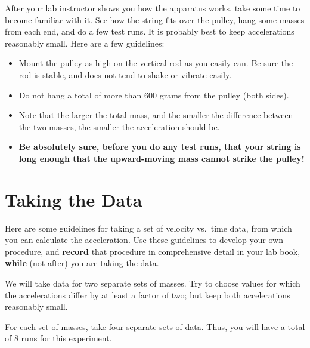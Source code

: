 
After your lab instructor shows you how the apparatus works, take some
time to become familiar with it.  See how the string fits over the
pulley, hang some masses from each end, and do a few test runs.  It
is probably best to keep accelerations reasonably small.  Here
are a few guidelines:
\begin{itemize}
\item Mount the pulley as high on the vertical rod as you easily can.
Be
sure the rod is stable, and does not tend to shake or vibrate easily.
%
\item Do not hang a total of more than 600 grams from the pulley
(both sides).
%
\item Note that the larger the total mass, and the smaller the
difference
between the two masses, the smaller the acceleration should be.
%
\item {\bf Be absolutely sure, before you do any test runs, that your
string
is long enough that the upward-moving mass cannot strike the pulley! }
\end{itemize}

\section*{Taking the Data}

Here are some guidelines for taking a set of velocity vs.\ time data,
from which you can calculate the acceleration.
Use these guidelines to develop your own procedure, and {\bf record}
that procedure in comprehensive detail in your lab book, {\bf while}
(not after) you are taking the data.

We will take data for two separate sets of masses.  Try to choose
values for which the accelerations differ by at least a factor of two;
but keep both accelerations reasonably small.

For each set of masses, take four separate sets of data.  Thus, you
will have a total of 8 runs for this experiment.

